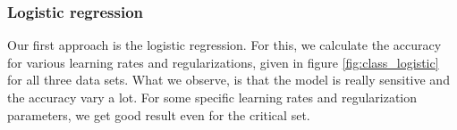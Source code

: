 \subsubsection{Logistic regression}
Our first approach is the logistic regression. For this, we calculate the accuracy for various learning rates and regularizations, given in figure \eqref{fig:class_logistic} for all three data sets. What we observe, is that the model is really sensitive and the accuracy vary a lot. For some specific learning rates and regularization parameters, we get good result even for the critical set.
\begin{figure} [H]%
	\centering
	\\
	
	\\
	
	\\
	

\end{figure}
